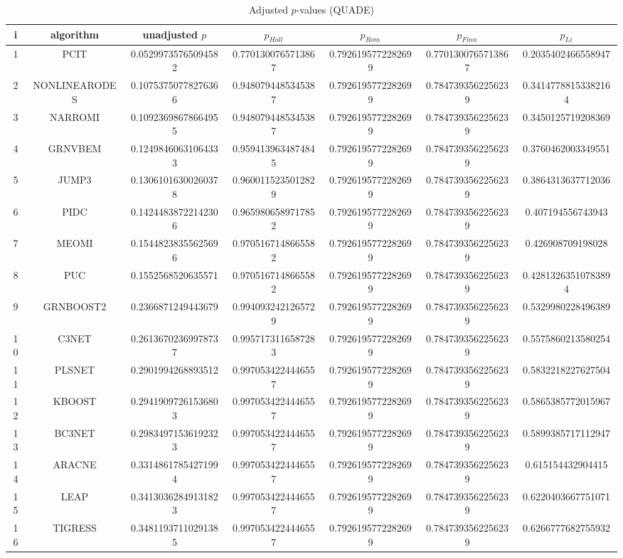 \documentclass[a4paper,10pt]{article}
\begin{document}
\begin{landscape}
\begin{table}[!htp]
\centering\scriptsize
\caption{Adjusted $p$-values (QUADE)}
\begin{tabular}{ccccccc}
i&algorithm&unadjusted $p$&$p_{Holl}$&$p_{Rom}$&$p_{Finn}$&$p_{Li}$\\
\hline
1&PCIT&0.05299735765094582&0.7701300765713867&0.7926195772282699&0.7701300765713867&0.2035402466558947\\
2&NONLINEARODES&0.10753750778276366&0.9480794485345387&0.7926195772282699&0.7847393562256239&0.34147788153382164\\
3&NARROMI&0.10923698678664955&0.9480794485345387&0.7926195772282699&0.7847393562256239&0.3450125719208369\\
4&GRNVBEM&0.12498460631064333&0.9594139634874845&0.7926195772282699&0.7847393562256239&0.3760462003349551\\
5&JUMP3&0.13061016300260378&0.9600115235012829&0.7926195772282699&0.7847393562256239&0.3864313637712036\\
6&PIDC&0.14244838722142306&0.9659806589717852&0.7926195772282699&0.7847393562256239&0.407194556743943\\
7&MEOMI&0.15448238355625696&0.9705167148665582&0.7926195772282699&0.7847393562256239&0.426908709198028\\
8&PUC&0.1552568520635571&0.9705167148665582&0.7926195772282699&0.7847393562256239&0.42813263510783894\\
9&GRNBOOST2&0.2366871249443679&0.9940932421265729&0.7926195772282699&0.7847393562256239&0.5329980228496389\\
10&C3NET&0.26136702369978737&0.9957173116587283&0.7926195772282699&0.7847393562256239&0.5575860213580254\\
11&PLSNET&0.2901994268893512&0.9970534224446557&0.7926195772282699&0.7847393562256239&0.5832218227627504\\
12&KBOOST&0.29419097261536803&0.9970534224446557&0.7926195772282699&0.7847393562256239&0.5865385772015967\\
13&BC3NET&0.29834971536192323&0.9970534224446557&0.7926195772282699&0.7847393562256239&0.5899385717112947\\
14&ARACNE&0.33148617854271994&0.9970534224446557&0.7926195772282699&0.7847393562256239&0.615154432904415\\
15&LEAP&0.34130362849131823&0.9970534224446557&0.7926195772282699&0.7847393562256239&0.6220403667751071\\
16&TIGRESS&0.34811937110291385&0.9970534224446557&0.7926195772282699&0.7847393562256239&0.6266777682755932\\

\end{tabular}
\end{table}
\end{landscape}
\end{document}
